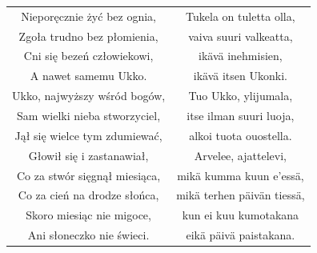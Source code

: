 \documentclass[11pt,a4paper,twoside]{report}
\begin{document}
\newpage
{\centering
\small
\begin{longtable}{c c}
Nieporęcznie żyć bez ognia, & Tukela on tuletta olla, \\
Zgoła trudno bez płomienia, & vaiva suuri valkeatta, \\
Cni się bezeń człowiekowi, & ikävä inehmisien, \\
A nawet samemu Ukko. & ikävä itsen Ukonki. \\
Ukko, najwyższy wśród bogów, & Tuo Ukko, ylijumala, \\
Sam wielki nieba stworzyciel, & itse ilman suuri luoja, \\
Jął się wielce tym zdumiewać, & alkoi tuota ouostella. \\
Głowił się i zastanawiał, & Arvelee, ajattelevi, \\
Co za stwór sięgnął miesiąca, & mikä kumma kuun e'essä, \\
Co za cień na drodze słońca, & mikä terhen päivän tiessä, \\
Skoro miesiąc nie migoce, & kun ei kuu kumotakana \\
Ani słoneczko nie świeci. & eikä päivä paistakana. \\
\end{longtable}
}
\vspace*{\baselineskip}
\end{document}
